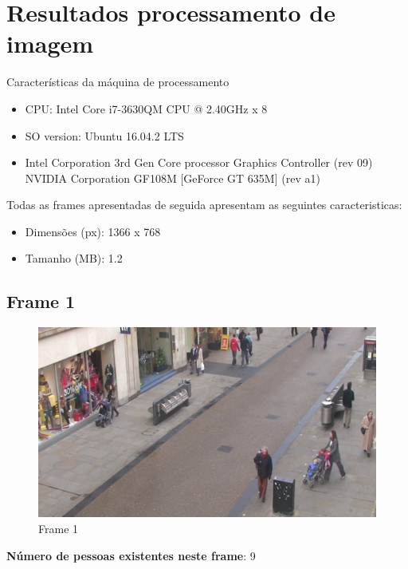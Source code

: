\chapter{Resultados processamento de imagem }

Características da máquina de processamento  
\begin{itemize}
	\item CPU: Intel Core i7-3630QM CPU @ 2.40GHz x 8
	\item SO version: Ubuntu 16.04.2 LTS
	\item Intel Corporation 3rd Gen Core processor Graphics Controller (rev 09)
	NVIDIA Corporation GF108M [GeForce GT 635M] (rev a1)
\end{itemize}

Todas as frames apresentadas de seguida apresentam as seguintes caracteristicas: 
\begin{itemize}
	\item Dimensões (px): 1366 x 768
	\item Tamanho (MB): 1.2 
\end{itemize}


\section{Frame 1}

\begin{figure}[!htb]
	\centering
	\includegraphics[width=0.5\linewidth]{img/vision/frame1.png}
	\caption{Frame 1 }
	\label{db}
\end{figure}

\textbf{Número de pessoas existentes neste frame}: 9

